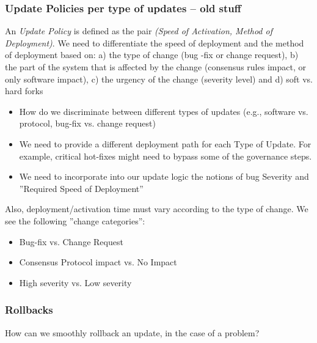 \subsubsection*{Update Policies per type of updates -- old stuff}
An \emph{Update Policy} is defined as the pair \emph{(Speed of Activation, Method of Deployment)}. We need to differentiate the speed of deployment and the method of deployment based on: a) the type of change (bug -fix or change request), b) the part of the system that is affected by the change (consensus rules impact, or only software impact), c) the urgency of the change (severity level)
and d) soft vs. hard forks


\begin{itemize}
\item How do we discriminate between different types of updates (e.g., software vs. protocol, bug-fix vs. change request)
\item We need to provide a different deployment path for each Type of Update. For example, critical hot-fixes might need to bypass some of the governance steps.
\item We need to incorporate into our update logic the notions of bug Severity and ''Required Speed of Deployment''
\end{itemize}

Also, deployment/activation time must vary according to the type of change. We see the following ''change categories'':
\begin{itemize}
\item Bug-fix vs. Change Request
\item Consensus Protocol impact vs. No Impact
\item High severity vs. Low severity
\end{itemize}

\subsubsection{Rollbacks}
How can we smoothly rollback an update, in the case of a problem?
